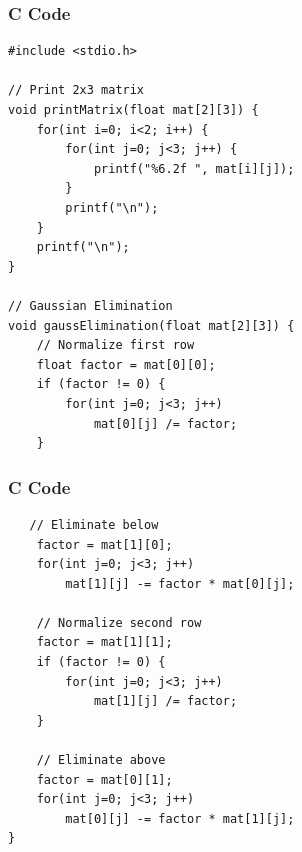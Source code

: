 \documentclass{beamer}
\begin{document}
\begin{frame}[fragile]
\frametitle{C Code}
\begin{lstlisting}
#include <stdio.h>

// Print 2x3 matrix
void printMatrix(float mat[2][3]) {
    for(int i=0; i<2; i++) {
        for(int j=0; j<3; j++) {
            printf("%6.2f ", mat[i][j]);
        }
        printf("\n");
    }
    printf("\n");
}

// Gaussian Elimination
void gaussElimination(float mat[2][3]) {
    // Normalize first row
    float factor = mat[0][0];
    if (factor != 0) {
        for(int j=0; j<3; j++)
            mat[0][j] /= factor;
    }

    \end{lstlisting}

\end{frame}

\begin{frame}[fragile]
\frametitle{C Code}
\begin{lstlisting}
   // Eliminate below
    factor = mat[1][0];
    for(int j=0; j<3; j++)
        mat[1][j] -= factor * mat[0][j];

    // Normalize second row
    factor = mat[1][1];
    if (factor != 0) {
        for(int j=0; j<3; j++)
            mat[1][j] /= factor;
    }

    // Eliminate above
    factor = mat[0][1];
    for(int j=0; j<3; j++)
        mat[0][j] -= factor * mat[1][j];
}

\end{lstlisting}
\end{frame}
\end{document}
